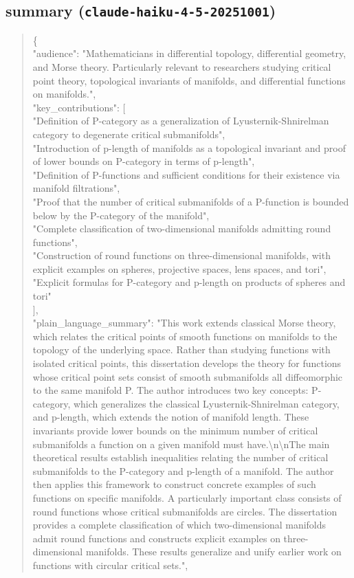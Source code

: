 \documentclass[11pt]{article}
\begin{document}
\subsection*{summary (\texttt{claude-haiku-4-5-20251001})}
\begin{quote}\small\ttfamily\raggedright
\{\\
  "audience": "Mathematicians in differential topology, differential geometry, and Morse theory. Particularly relevant to researchers studying critical point theory, topological invariants of manifolds, and differential functions on manifolds.",\\
  "key\_contributions": [\\
    "Definition of P-category as a generalization of Lyusternik-Shnirelman category to degenerate critical submanifolds",\\
    "Introduction of p-length of manifolds as a topological invariant and proof of lower bounds on P-category in terms of p-length",\\
    "Definition of P-functions and sufficient conditions for their existence via manifold filtrations",\\
    "Proof that the number of critical submanifolds of a P-function is bounded below by the P-category of the manifold",\\
    "Complete classification of two-dimensional manifolds admitting round functions",\\
    "Construction of round functions on three-dimensional manifolds, with explicit examples on spheres, projective spaces, lens spaces, and tori",\\
    "Explicit formulas for P-category and p-length on products of spheres and tori"\\
  ],\\
  "plain\_language\_summary": "This work extends classical Morse theory, which relates the critical points of smooth functions on manifolds to the topology of the underlying space. Rather than studying functions with isolated critical points, this dissertation develops the theory for functions whose critical point sets consist of smooth submanifolds all diffeomorphic to the same manifold P. The author introduces two key concepts: P-category, which generalizes the classical Lyusternik-Shnirelman category, and p-length, which extends the notion of manifold length. These invariants provide lower bounds on the minimum number of critical submanifolds a function on a given manifold must have.\textbackslash{}n\textbackslash{}nThe main theoretical results establish inequalities relating the number of critical submanifolds to the P-category and p-length of a manifold. The author then applies this framework to construct concrete examples of such functions on specific manifolds. A particularly important class consists of round functions whose critical submanifolds are circles. The dissertation provides a complete classification of which two-dimensional manifolds admit round functions and constructs explicit examples on three-dimensional manifolds. These results generalize and unify earlier work on functions with circular critical sets.",\\

\end{quote}
\end{document}
